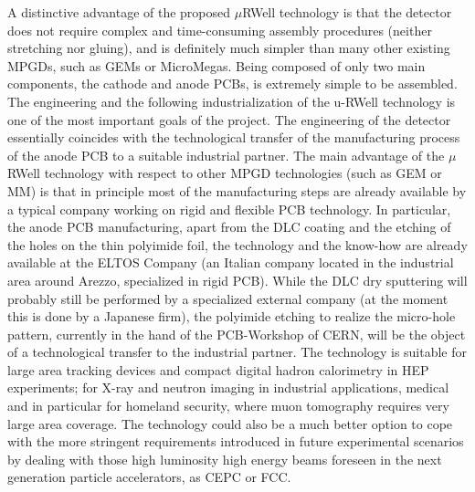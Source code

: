 A distinctive advantage of the proposed $\mu$RWell technology is that the detector does not require complex and time-consuming assembly procedures (neither stretching nor gluing), and is definitely much simpler than many other existing MPGDs, such as GEMs or MicroMegas. 
Being composed of only two main components, the cathode and anode PCBs, is extremely simple to be assembled. 
The engineering and the following industrialization of the u-RWell technology is one of the most important goals of the project.
The engineering of the detector essentially coincides with the technological transfer of the manufacturing process of the anode PCB to a suitable industrial partner. 
The main advantage of the $\mu$RWell technology with respect to other MPGD technologies (such as GEM or MM) is that in principle most of the manufacturing steps are already available by a typical company working on rigid and flexible PCB technology. 
In particular, the anode PCB manufacturing, apart from the DLC coating and the etching of the holes on the thin polyimide foil, the technology and the know-how are already available at the ELTOS Company (an Italian company located in the industrial area around Arezzo, specialized in rigid PCB).
While the DLC dry sputtering will probably still be performed by a specialized external company (at the moment this is done by a Japanese firm), the polyimide etching to realize the micro-hole pattern, currently in the hand of the PCB-Workshop of CERN, will be the object of a technological transfer to the industrial partner.
The technology is suitable for large area tracking devices and compact digital hadron calorimetry in HEP experiments; for X-ray and neutron imaging in industrial applications, medical and in particular for homeland security, where muon tomography requires very large area coverage.
The technology could also be a much better option to cope with the more stringent requirements introduced in future experimental scenarios by dealing with those high luminosity high energy beams foreseen in the next generation particle accelerators, as CEPC or FCC.


